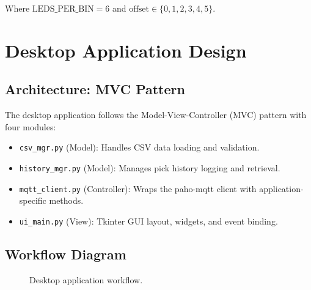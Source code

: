 Where $\text{LEDS\_PER\_BIN} = 6$ and $\text{offset} \in \{0, 1, 2, 3, 4, 5\}$.

\section{Desktop Application Design}
\label{sec:app-design}

\subsection{Architecture: MVC Pattern}
\label{sec:mvc}

The desktop application follows the Model-View-Controller (MVC) pattern with four modules:

\begin{itemize}
  \item \texttt{csv\_mgr.py} (Model): Handles CSV data loading and validation.
  \item \texttt{history\_mgr.py} (Model): Manages pick history logging and retrieval.
  \item \texttt{mqtt\_client.py} (Controller): Wraps the paho-mqtt client with application-specific methods.
  \item \texttt{ui\_main.py} (View): Tkinter GUI layout, widgets, and event binding.
\end{itemize}

\subsection{Workflow Diagram}
\label{sec:workflow}

\begin{figure}[H]
  \centering
  \caption{Desktop application workflow.}
  \label{fig:workflow}
\end{figure}

